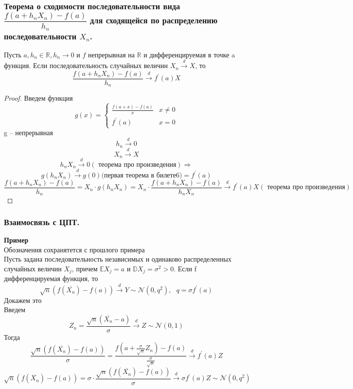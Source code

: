 	\subsubsection{Теорема о сходимости последовательности вида $\dfrac{f(a + h_n X_n) - f(a)}{h_n}$ для сходящейся по распределению последовательности $X_n$. }
	\begin{theorem*}
		Пусть $  a, h_n \in \mathbb{R}, h_n\to0 $ и $ f $ непрерывная на $ \mathbb{R} $ и дифференцируемая в точке a функция. Если последовательность случайных величин $ X_n \xrightarrow{d} X $, то
		$$\frac{f(a + h_nX_n) - f(a)}{h_n}\xrightarrow{d}f^{'}(a)X$$
	\end{theorem*}
	\begin{proof}
		Введем функция
		\begin{equation*}
			g(x) = 
			\begin{cases}
				\frac{f(a + x) - f(a)}{x} & x\neq 0\\
				f^{'}(a) & x = 0
			\end{cases}
		\end{equation*}
		g -- непрерывная
		$$h_n\xrightarrow{d} 0$$
		$$X_n\xrightarrow{d}X$$
		$$h_nX_n\xrightarrow{d}0(\text{ теорема про произведения})\Rightarrow$$
		$$g(h_nX_n)\xrightarrow{d}g(0)\text{(первая теорема в билете6)} = f^{'}(a)$$
		$$\frac{f(a + h_nX_n) - f(a)}{h_n} = X_n\cdot g(h_nX_n) = X_n\cdot\frac{f(a + h_nX_n) - f(a)}{h_nX_n} \xrightarrow{d}f^{'}(a)X(\text{ теорема про произведения})$$
	\end{proof}
	\subsubsection{Взаимосвязь с ЦПТ.}
	\textbf{Пример}\\
	Обозначения сохранятется с прошлого примера\\
	Пусть задана последовательность независимых и одинаково распределенных
	случайных величин $ X_j $, причем $  \mathbb{E}X_j = a$ и $\mathbb{D}X_j = \sigma^2 > 0 $. Если f дифференцируемая функция, то
	$$\sqrt{n}(f(\overline{X_n}) - f(a))\xrightarrow{d}Y\sim\mathcal{N}(0, q^2),\text{ }q=\sigma f^{'}(a)$$
	Докажем это\\
	Введем
	$$ Z_n = \frac{\sqrt{n}(\overline{X_n} - a)}{\sigma}\xrightarrow{d}Z\sim\mathcal{N}(0,1)$$
	Тогда
	$$\frac{\sqrt{n}(f(\overline{X_n}) - f(a))}{\sigma} = \frac{f(a + \frac{\sigma}{\sqrt{n}} Z_n) - f(a)}{\frac{\sigma}{\sqrt{n}}}\xrightarrow{d}f^{'}(a)Z$$
	$$\sqrt{n}(f(\overline{X_n}) - f(a)) = \sigma \cdot \frac{\sqrt{n}(f(\overline{X_n}) - f(a))}{\sigma}\xrightarrow{d}\sigma f^{'}(a)Z\sim \mathcal{N}(0, q^2)$$
